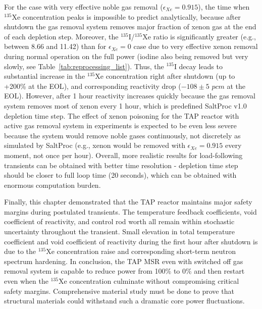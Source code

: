 For the case with very effective noble gas removal ($\epsilon_{Xe}=0.915$), 
the time when $^{135}$Xe concentration peaks is impossible to predict 
analytically, because after shutdown the gas removal system removes major 
fraction of xenon gas at the end of each depletion step. Moreover, the 
$^{135}$I/$^{135}$Xe ratio is significantly greater (e.g., between 8.66 and 
11.42) than for $\epsilon_{Xe}=0$ case due to very effective xenon removal 
during normal operation on the full power (iodine also being removed but very 
slowly, see Table~\ref{tab:reprocessing_list}). Thus, the $^{135}$I decay 
leads to substantial increase in the $^{135}$Xe concentration right after 
shutdown (up to +200\% at the \gls{EOL}), and corresponding reactivity drop 
($-108\pm5$ $pcm$ at the \gls{EOL}). However, after 1 hour reactivity 
increases quickly because the gas removal system removes most of xenon every 1 
hour, which is predefined SaltProc v1.0 depletion time step. The effect of 
xenon poisoning for the \gls{TAP} reactor with active gas removal system in 
experiments is expected to be even less severe because the system would remove 
noble gases continuously, not discretely as simulated by SaltProc (e.g., xenon 
would be removed with $\epsilon_{Xe}=0.915$ every moment, not once per hour). 
Overall, more realistic results for load-following transients can be obtained 
with better time resolution - depletion time step should be closer to full 
loop time (20 seconds), which can be obtained with enormous computation burden.

Finally, this chapter demonstrated that the \gls{TAP} reactor maintains major 
safety margins during postulated transients. The temperature feedback 
coefficients, void coefficient of reactivity, and control rod worth all remain 
within stochastic uncertainty throughout the transient. Small elevation in 
total temperature coefficient and void coefficient of reactivity during the 
first hour after shutdown is due to the $^{135}$Xe concentration raise and 
corresponding short-term neutron spectrum hardening. In conclusion, the 
\gls{TAP} \gls{MSR} even with switched off gas removal system is capable to 
reduce power from 100\% to 0\% and then restart even when the $^{135}$Xe 
concentration culminate without compromising critical safety margins. 
Comprehensive material study must be done to prove that structural materials 
could withstand such a dramatic core power fluctuations.





